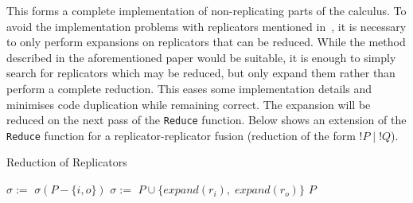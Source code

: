         This forms a complete implementation of non-replicating parts of the calculus.
        To avoid the implementation problems with replicators mentioned in~\cite{solo-diagrams}, it is necessary to only perform expansions on replicators that can be reduced.
        While the method described in the aforementioned paper would be suitable, it is enough to simply search for replicators which may be reduced, but only expand them rather than perform a complete reduction.
        This eases some implementation details and minimises code duplication while remaining correct.
        The expansion will be reduced on the next pass of the \texttt{Reduce} function.
        Below shows an extension of the \texttt{Reduce} function for a replicator-replicator fusion (reduction of the form $!P \;|\; !Q$).

        \begin{breakablealgorithm}
            \caption{Reduction of Replicators}
            \begin{algorithmic}[1]
                     
                         
                             
                                \State$\sigma :=$ 
                                    \State\Return$\sigma(P - \{i, o\})$
                                \EndIf
                            \EndIf
                        \EndFor
                    \EndFor
                     
                                \State$\sigma :=$  
                                    \State\Return$P \cup \{expand(r_i), \; expand(r_o)\}$ 
                                \EndIf
                            \EndIf
                        \EndFor
                    \EndFor
                    \State\Return$P$
                \EndFunction
            \end{algorithmic}
        \end{breakablealgorithm}




